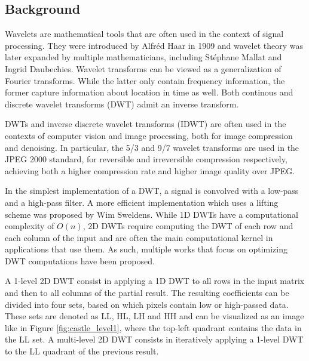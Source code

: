 \subsection{Background}
Wavelets are mathematical tools that are often used in the context of signal processing. They were introduced by Alfréd Haar in 1909\cite{haar} and wavelet theory was later expanded by multiple mathematicians, including Stéphane Mallat and Ingrid Daubechies. Wavelet transforms can be viewed as a generalization of Fourier transforms. While the latter only contain frequency information, the former capture information about location in time as well. Both continous and discrete wavelet transforms (DWT) admit an inverse transform.

DWTs and inverse discrete wavelet transforms (IDWT) are often used in the contexts of computer vision\cite{wavelet_application_4} and image processing\cite{wavelet_application_1}\cite{wavelet_application_2}, both for image compression and denoising\cite{wavelet_application_3}. In particular, the 5/3 and 9/7 wavelet transforms are used in the JPEG 2000 standard, for reversible and irreversible compression respectively, achieving both a higher compression rate and higher image quality over JPEG.

In the simplest implementation of a DWT, a signal is convolved with a low-pass and a high-pass filter. A more efficient implementation which uses a lifting scheme was proposed by Wim Sweldens\cite{lifting}. While 1D DWTs have a computational complexity of $O(n)$, 2D DWTs require computing the DWT of each row and each column of the input and are often the main computational kernel in applications that use them. As such, multiple works that focus on optimizing DWT computations have been proposed\cite{wavelet_fast_1}\cite{wavelet_fast_2}\cite{wavelet_fast_3}\cite{wavelet_fast_4}.

A 1-level 2D DWT consist in applying a 1D DWT to all rows in the input matrix and then to all columns of the partial result. The resulting coefficients can be divided into four sets, based on which pixels contain low or high-passed data. These sets are denoted as LL, HL, LH and HH and can be visualized as an image like in Figure \ref{fig:castle_level1}, where the top-left quadrant contains the data in the LL set. A multi-level 2D DWT consists in iteratively applying a 1-level DWT to the LL quadrant of the previous result.

